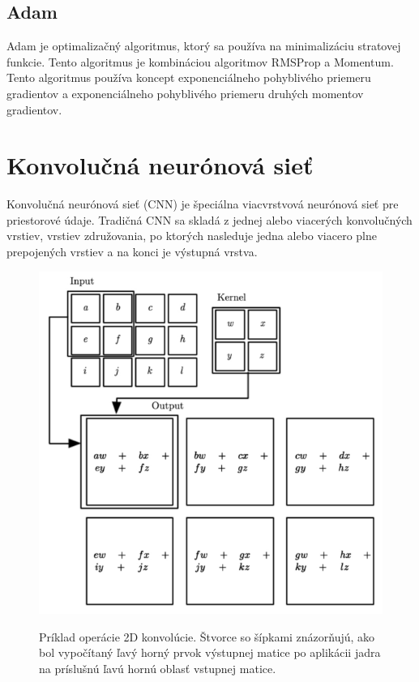 \subsection{Adam}\label{subsec:adam}

Adam je optimalizačný algoritmus, ktorý sa používa na minimalizáciu stratovej
funkcie. Tento algoritmus je kombináciou algoritmov RMSProp a Momentum. Tento
algoritmus používa koncept exponenciálneho pohyblivého priemeru gradientov a
exponenciálneho pohyblivého priemeru druhých momentov gradientov.

\section{Konvolučná neurónová sieť}\label{sec:cnn}

Konvolučná neurónová sieť (CNN) je špeciálna viacvrstvová neurónová sieť pre
priestorové údaje. Tradičná CNN sa skladá z jednej alebo viacerých konvolučných
vrstiev, vrstiev združovania, po ktorých nasleduje jedna alebo viacero plne
prepojených vrstiev a na konci je výstupná vrstva.

\begin{figure}[H]
  \includegraphics{images/konvolucia.png}\label{img:cnn}
  \caption{Príklad operácie 2D konvolúcie. Štvorce so šípkami znázorňujú, ako
  bol vypočítaný ľavý horný prvok výstupnej matice po aplikácii jadra na príslušnú ľavú
  hornú oblasť vstupnej matice.}
\end{figure}

